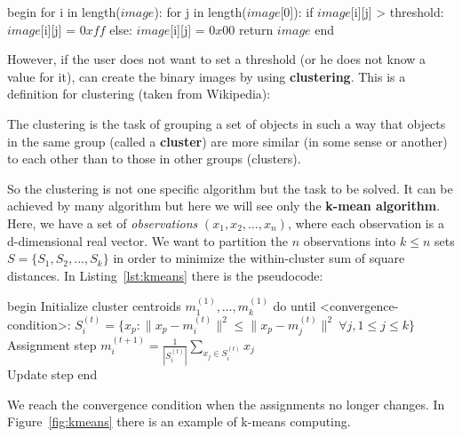 \begin{pseudo}[caption={Image Thresholding}, label={lst:Thresholding}]
begin
 for i in length($image$):
   for j in length($image$[0]):
     if $image$[i][j] > threshold:
       $image$[i][j] = $0xff$
     else:
       $image$[i][j] = $0x00$
 return $image$
end       
\end{pseudo}

However, if the user does not want to set a threshold (or he does not know a value for it), can create the binary images by using \textbf{clustering}. This is a definition for clustering (taken from Wikipedia):
\begin{definition}[Clustering]
 The clustering is the task of grouping a set of objects in such a way that objects in the same group (called a \textbf{cluster}) are more similar (in some sense or another) to each other than to those in other groups (clusters).
\end{definition}

So the clustering is not one specific algorithm but the task to be solved. It can be achieved by many algorithm but here we will see only the \textbf{k-mean algorithm}. Here, we have a set of \textit{observations} $(x_1,x_2,\dots,x_n)$, where each observation is a d-dimensional real vector. We want to partition the $n$ observations into $k \leq n$ sets $S = \{S_1,S_2,\dots,S_k \}$ in order to minimize the within-cluster sum of square distances. In Listing~\ref{lst:kmeans} there is the pseudocode:

\begin{pseudo}[caption={K-means algorithm}, label={lst:kmeans}]
begin
  Initialize cluster centroids $m_1^{(1)},\dots,m_k^{(1)}$
  do until <convergence-condition>:
    $S_i^{(t)} = \{ x_p \colon \| x_p - m^{(t)}_i \|^2 \le \| x_p - m^{(t)}_j \|^2 \ \forall j, 1 \le j \le k \}$
				    \\Assignment step
    $m^{(t+1)}_i = \frac{1}{|S^{(t)}_i|} \displaystyle\sum_{x_j \in S^{(t)}_i} x_j$ \\ Update step
end       
\end{pseudo}

We reach the convergence condition when the assignments no longer changes. In Figure~\ref{fig:kmeans} there is an example of k-means computing.

